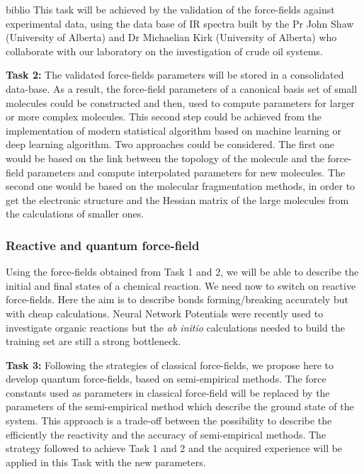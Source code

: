 \documentclass[11pt]{artuppax}
\newcounter{subsec}[section]
\begin{document}
\begin{btSect}{biblio}
This task will be achieved by the validation of the force-fields against experimental data, using the data base of IR spectra built by the Pr John Shaw (University of Alberta)  and Dr Michaelian Kirk (University of Alberta) who collaborate with our laboratory on the investigation of crude oil systems.

\textbf{Task 2:}
The validated force-fields parameters will be stored in a consolidated data-base. As a result, the force-field parameters of a canonical basis set of small molecules could be constructed and then, used to compute parameters for larger or more complex molecules. This second step could be achieved from the implementation of modern statistical algorithm based on machine learning or deep learning algorithm. Two approaches could be considered. The first one would be based on the link between the topology of the molecule and the force-field parameters and compute interpolated parameters for new molecules. The second one would be based on the molecular fragmentation methods, in order to get the electronic structure and the Hessian matrix of the large molecules from the calculations of smaller ones\cite{he2014, collins2014}.

\subsubsection{Reactive and quantum force-field}

Using the force-fields obtained from Task 1 and 2, we will be able to describe the initial and final states of a chemical reaction. We need now to switch on reactive force-fields. Here the aim is to describe bonds forming/breaking accurately but with cheap calculations. Neural Network Potentials were recently used to investigate organic reactions\cite{gastegger20015} but the \textit{ab initio} calculations needed to build the training set are still a strong bottleneck.

\textbf{Task 3:}
Following the strategies of classical force-fields, we propose here to develop quantum force-fields, based on semi-empirical methods. The force constants used as parameters in classical force-field will be replaced by the parameters of the semi-empirical method which describe the ground state of the system.  This approach is a trade-off between the possibility to describe the efficiently the reactivity and the accuracy of semi-empirical methods. The strategy followed to achieve Task 1 and 2 and the acquired experience will be applied in this  Task with the new parameters.



\end{btSect}
\end{document}
